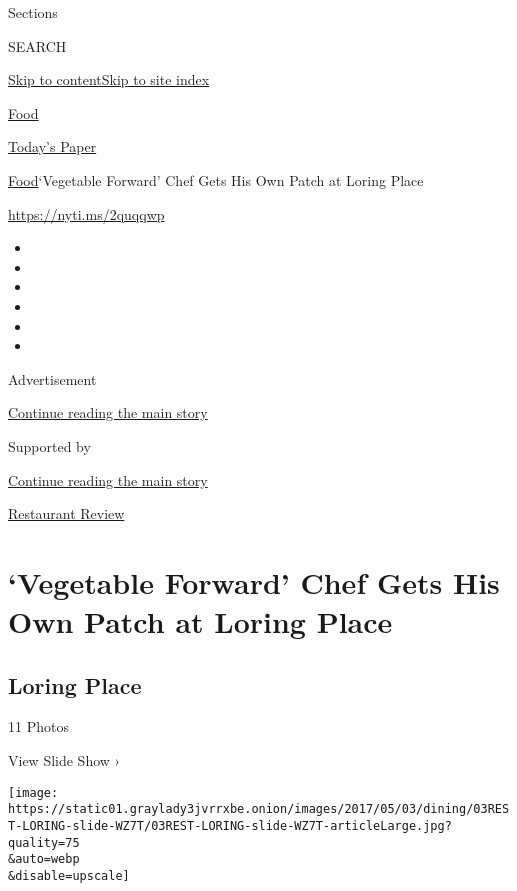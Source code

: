Sections

SEARCH

\protect\hyperlink{site-content}{Skip to
content}\protect\hyperlink{site-index}{Skip to site index}

\href{https://www.nytimes3xbfgragh.onion/section/food}{Food}

\href{https://myaccount.nytimes3xbfgragh.onion/auth/login?response_type=cookie\&client_id=vi}{}

\href{https://www.nytimes3xbfgragh.onion/section/todayspaper}{Today's
Paper}

\href{/section/food}{Food}\textbar{}`Vegetable Forward' Chef Gets His
Own Patch at Loring Place

\url{https://nyti.ms/2quqqwp}

\begin{itemize}
\item
\item
\item
\item
\item
\item
\end{itemize}

Advertisement

\protect\hyperlink{after-top}{Continue reading the main story}

Supported by

\protect\hyperlink{after-sponsor}{Continue reading the main story}

\href{/column/restaurant-review}{Restaurant Review}

\hypertarget{vegetable-forward-chef-gets-his-own-patch-at-loring-place}{%
\section{`Vegetable Forward' Chef Gets His Own Patch at Loring
Place}\label{vegetable-forward-chef-gets-his-own-patch-at-loring-place}}

\href{https://www.nytimes3xbfgragh.onion/slideshow/2017/05/02/dining/loring-place.html}{}

\hypertarget{loring-place}{%
\subsection{Loring Place}\label{loring-place}}

11 Photos

View Slide Show ›

\texttt{[image: https://static01.graylady3jvrrxbe.onion/images/2017/05/03/dining/03REST-LORING-slide-WZ7T/03REST-LORING-slide-WZ7T-articleLarge.jpg?quality=75\\\&auto=webp\\\&disable=upscale]}


